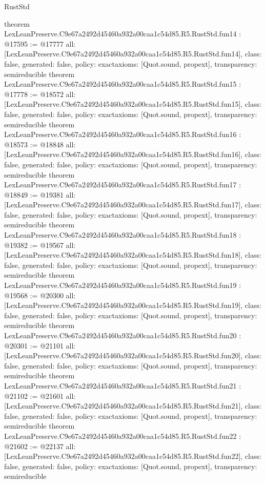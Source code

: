 \begin{lexlean}{RustStd}
\begin{coremodule}
{}
theorem LexLeanPreserve.C9e67a2492d45460a932a00caa1c54d85.R5.RustStd.fun14 : @17595 := @17777 {
  all: [LexLeanPreserve.C9e67a2492d45460a932a00caa1c54d85.R5.RustStd.fun14],
  class: false,
  generated: false,
  policy: exact{axioms: [Quot.sound, propext]},
  transparency: semireducible
}
theorem LexLeanPreserve.C9e67a2492d45460a932a00caa1c54d85.R5.RustStd.fun15 : @17778 := @18572 {
  all: [LexLeanPreserve.C9e67a2492d45460a932a00caa1c54d85.R5.RustStd.fun15],
  class: false,
  generated: false,
  policy: exact{axioms: [Quot.sound, propext]},
  transparency: semireducible
}
theorem LexLeanPreserve.C9e67a2492d45460a932a00caa1c54d85.R5.RustStd.fun16 : @18573 := @18848 {
  all: [LexLeanPreserve.C9e67a2492d45460a932a00caa1c54d85.R5.RustStd.fun16],
  class: false,
  generated: false,
  policy: exact{axioms: [Quot.sound, propext]},
  transparency: semireducible
}
theorem LexLeanPreserve.C9e67a2492d45460a932a00caa1c54d85.R5.RustStd.fun17 : @18849 := @19381 {
  all: [LexLeanPreserve.C9e67a2492d45460a932a00caa1c54d85.R5.RustStd.fun17],
  class: false,
  generated: false,
  policy: exact{axioms: [Quot.sound, propext]},
  transparency: semireducible
}
theorem LexLeanPreserve.C9e67a2492d45460a932a00caa1c54d85.R5.RustStd.fun18 : @19382 := @19567 {
  all: [LexLeanPreserve.C9e67a2492d45460a932a00caa1c54d85.R5.RustStd.fun18],
  class: false,
  generated: false,
  policy: exact{axioms: [Quot.sound, propext]},
  transparency: semireducible
}
theorem LexLeanPreserve.C9e67a2492d45460a932a00caa1c54d85.R5.RustStd.fun19 : @19568 := @20300 {
  all: [LexLeanPreserve.C9e67a2492d45460a932a00caa1c54d85.R5.RustStd.fun19],
  class: false,
  generated: false,
  policy: exact{axioms: [Quot.sound, propext]},
  transparency: semireducible
}
theorem LexLeanPreserve.C9e67a2492d45460a932a00caa1c54d85.R5.RustStd.fun20 : @20301 := @21101 {
  all: [LexLeanPreserve.C9e67a2492d45460a932a00caa1c54d85.R5.RustStd.fun20],
  class: false,
  generated: false,
  policy: exact{axioms: [Quot.sound, propext]},
  transparency: semireducible
}
theorem LexLeanPreserve.C9e67a2492d45460a932a00caa1c54d85.R5.RustStd.fun21 : @21102 := @21601 {
  all: [LexLeanPreserve.C9e67a2492d45460a932a00caa1c54d85.R5.RustStd.fun21],
  class: false,
  generated: false,
  policy: exact{axioms: [Quot.sound, propext]},
  transparency: semireducible
}
theorem LexLeanPreserve.C9e67a2492d45460a932a00caa1c54d85.R5.RustStd.fun22 : @21602 := @22137 {
  all: [LexLeanPreserve.C9e67a2492d45460a932a00caa1c54d85.R5.RustStd.fun22],
  class: false,
  generated: false,
  policy: exact{axioms: [Quot.sound, propext]},
  transparency: semireducible
}
\end{coremodule}
\end{lexlean}
